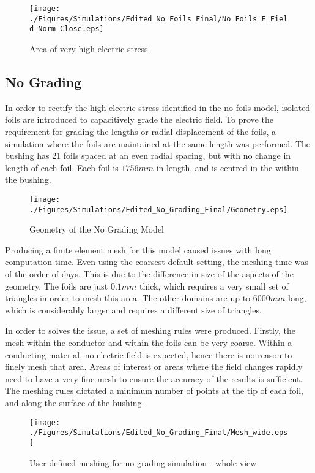 \begin{figure}[!h]
   \centering
   \texttt{[image: ./Figures/Simulations/Edited\_No\_Foils\_Final/No\_Foils\_E\_Field\_Norm\_Close.eps]}
   \caption{Area of very high electric stress}
   \label{figure:problemfield}
\end{figure}

\subsection{No Grading}
In order to rectify the high electric stress identified in the no foils model, isolated foils are introduced to capacitively grade the electric field.
To prove the requirement for grading the lengths or radial displacement of the foils, a simulation where the foils are maintained at the same length was performed.
The bushing has 21 foils spaced at an even radial spacing, but with no change in length of each foil.
Each foil is $1756mm$ in length, and is centred in the within the bushing. 

\begin{figure}[!h]
  \centering
    \texttt{[image: ./Figures/Simulations/Edited\_No\_Grading\_Final/Geometry.eps]} 
	\caption{Geometry of the No Grading Model}
	\label{Figure:No_Grading_Geom}
\end{figure}

Producing a finite element mesh for this model caused issues with long computation time. 
Even using the coarsest default setting, the meshing time was of the order of days.
This is due to the difference in size of the aspects of the geometry.
The foils are just $0.1mm$ thick, which requires a very small set of triangles in order to mesh this area.
The other domains are up to $6000mm$ long, which is considerably larger and requires a different size of triangles.

In order to solves the issue, a set of meshing rules were produced.
Firstly, the mesh within the conductor and within the foils can be very coarse.
Within a conducting material, no electric field is expected, hence there is no reason to finely mesh that area.
Areas of interest or areas where the field changes rapidly need to have a very fine mesh to ensure the accuracy of the results is sufficient.
The meshing rules dictated a minimum number of points at the tip of each foil, and along the surface of the bushing.

\begin{figure}[!h]
  \centering
    \texttt{[image: ./Figures/Simulations/Edited\_No\_Grading\_Final/Mesh\_wide.eps]} 
	\caption{User defined meshing for no grading simulation - whole view}
\label{Figure:No_Grading_Mesh1}
\end{figure}

